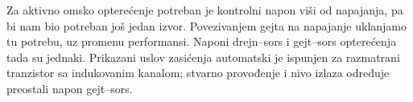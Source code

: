 Za aktivno omsko opterećenje potreban je kontrolni napon viši od napajanja, pa bi nam bio potreban još jedan izvor. Povezivanjem gejta na napajanje uklanjamo tu potrebu, uz promenu performansi. Naponi drejn–sors i gejt–sors opterećenja tada su jednaki. Prikazani uslov zasićenja automatski je ispunjen za razmatrani tranzistor sa indukovanim kanalom; stvarno provođenje i nivo izlaza određuje preostali napon gejt–sors.

